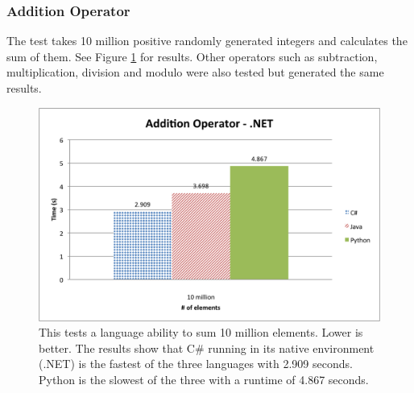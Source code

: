 \subsubsection{Addition Operator}

The test takes 10 million positive randomly generated integers and calculates the sum of them. See Figure \ref{fig:net_addition} for results. Other operators such as subtraction, multiplication, division and modulo were also tested but generated the same results.

\begin{figure}[h]
	\centering
	\includegraphics[width=1.0\linewidth]{chapters/new_media/AdditionOperatorNet.png}
	\caption{This tests a language ability to sum 10 million elements. Lower is better. The results show that C\# running in its native environment (.NET) is the fastest of the three languages with 2.909 seconds. Python is the slowest of the three with a runtime of 4.867 seconds.}
	\label{fig:net_addition}
\end{figure}
